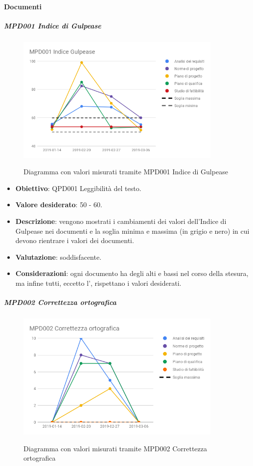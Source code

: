 	\paragraph{Documenti}

	\subparagraph{MPD001 Indice di Gulpease}

	\begin{figure}[H]
		\centering
		\includegraphics[width=0.9\textwidth]{img/cruscotti/RP/MPD001.png}
		\label{immaginegulpeaseRP}
		\caption{Diagramma con valori misurati tramite MPD001 Indice di Gulpease}
	\end{figure}

	\begin{itemize}
		\item \textbf{Obiettivo}: QPD001 Leggibilità del testo.
		\item \textbf{Valore desiderato}: 50 - 60.
		\item \textbf{Descrizione}: vengono mostrati i cambiamenti dei valori dell'Indice di Gulpease nei documenti e la soglia minima e massima (in grigio e nero) in cui devono rientrare i valori dei documenti.
		\item \textbf{Valutazione}: soddisfacente.
		\item \textbf{Considerazioni}: ogni documento ha degli alti e bassi nel corso della stesura, ma infine tutti, eccetto l'\AdRd, rispettano i valori desiderati.
	\end{itemize}


	\subparagraph{MPD002 Correttezza ortografica}

	\begin{figure}[H]
		\centering
		\includegraphics[width=0.9\textwidth]{img/cruscotti/RP/MPD002.png}
		\label{immagineCorrettezzaOrtograficaRP}
		\caption{Diagramma con valori misurati tramite MPD002 Correttezza ortografica}
	\end{figure}

